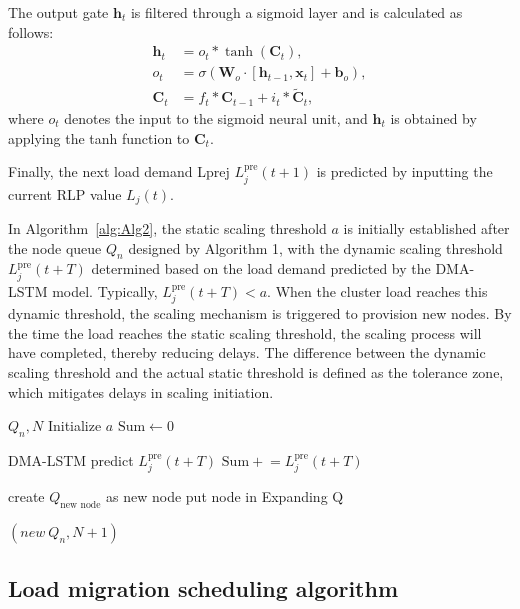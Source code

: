 \documentclass[twoside,twocolumn]{article}
\begin{document}
The output gate $\bm{h}_t$ is filtered through a sigmoid layer and is calculated as follows:
\begin{align}
\bm{h}_t &= o_t * \tanh\left(\bm{C}_t\right), \\
o_t &= \sigma\left(\bm{W}_o \cdot [\bm{h}_{t-1}, \bm{x}_t] + \bm{b}_o\right), \\
\bm{C}_t &= f_t * \bm{C}_{t-1} + i_t * \tilde{\bm{C}}_t,
\end{align}
where $o_t$ denotes the input to the sigmoid neural unit, and $\bm{h}_t$ is obtained by applying the tanh function to $\bm{C}_t$.

Finally, the next load demand Lprej $L_j^{\mathrm{pre}}(t+1)$ is predicted by inputting the current RLP value $L_j(t)$.

In Algorithm~\ref{alg:Alg2}, the static scaling threshold $a$ is initially established after the node queue $Q_n$ designed by Algorithm 1, with the dynamic scaling threshold $L_j^{\mathrm{pre}}(t+T)$ determined based on the load demand predicted by the DMA-LSTM model. Typically, $L_j^{\mathrm{pre}}(t+T) < a$. When the cluster load reaches this dynamic threshold, the scaling mechanism is triggered to provision new nodes. By the time the load reaches the static scaling threshold, the scaling process will have  completed, thereby reducing delays. The difference between the dynamic scaling threshold and the actual static threshold is defined as the tolerance zone, which mitigates delays in scaling initiation.

\begin{algorithm}[h!]
	\small
	\centering
	\caption{Dynamic elastic expansion algorithm}
	\label{alg:Alg2}
	\begin{algorithmic}[1]
	\REQUIRE $Q_n, N$  
	\STATE Initialize $a$
    \STATE $\text{Sum} \leftarrow 0$
	
		\STATE DMA-LSTM predict $L_j^{\mathrm{pre}}(t+T)$
		\STATE $\text{Sum} \mathrel{+}= L_j^{\mathrm{pre}}(t+T)$
	\ENDFOR
	
		\STATE create $Q_{\text{new node}}$ as new node
		\STATE put node in Expanding Q
	\ENDIF
	
	\RETURN $(new\ Q_n, N+1)$
	\end{algorithmic}
\end{algorithm}

\subsection{Load migration scheduling algorithm}
\end{document}
